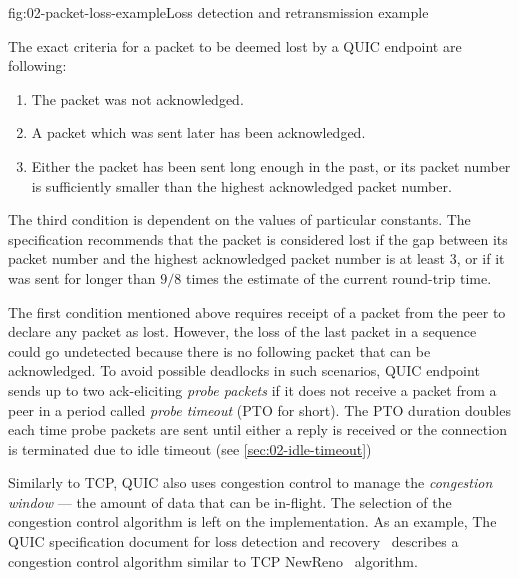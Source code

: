 \begin{myFigure}{fig:02-packet-loss-example}{Loss detection and retransmission example}

\resizebox{\linewidth}{!}{}

\end{myFigure}

The exact criteria for a packet to be deemed lost by a QUIC endpoint are following:

\begin{enumerate}

  \item The packet was not acknowledged.

  \item A packet which was sent later has been acknowledged.

  \item Either the packet has been sent long enough in the past, or its packet number is
sufficiently smaller than the highest acknowledged packet number.

\end{enumerate}

The third condition is dependent on the values of particular constants. The specification recommends
that the packet is considered lost if the gap between its packet number and the highest acknowledged
packet number is at least 3, or if it was sent for longer than $9/8$ times the estimate of the
current round-trip time.

The first condition mentioned above requires receipt of a packet from the peer to declare any packet
as lost. However, the loss of the last packet in a sequence could go undetected because there is no
following packet that can be acknowledged. To avoid possible deadlocks in such scenarios, QUIC
endpoint sends up to two ack-eliciting \textit{probe packets} if it does not receive a packet from a
peer in a period called \textit{probe timeout} (PTO for short). The PTO duration doubles each time
probe packets are sent until either a reply is received or the connection is terminated due to idle
timeout (see \autoref{sec:02-idle-timeout})

Similarly to TCP, QUIC also uses congestion control to manage the \textit{congestion window} --- the
amount of data that can be in-flight. The selection of the congestion control algorithm is left on
the implementation. As an example, The QUIC specification document for loss detection and recovery~\cite[Section~7]{draft-ietf-quic-recovery} describes a congestion control algorithm similar to TCP NewReno~\cite{rfc6582} algorithm.

